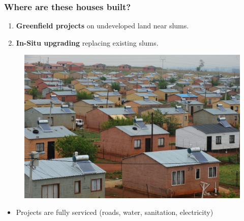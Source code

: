 \documentclass[aspectratio=149]{beamer}
\begin{document}
\begin{frame}
\frametitle{Where are these houses built?}

\begin{enumerate}
  \item \textbf{Greenfield projects} on undeveloped land near slums.
  \item \textbf{In-Situ upgrading} replacing existing slums.
\end{enumerate}

\begin{figure}
 \includegraphics[scale=.125]{rdp_houses.jpg} 
\end{figure}

\begin{itemize}
  \item Projects are fully serviced (roads, water, sanitation, electricity)
\end{itemize}

\end{frame}
\end{document}
